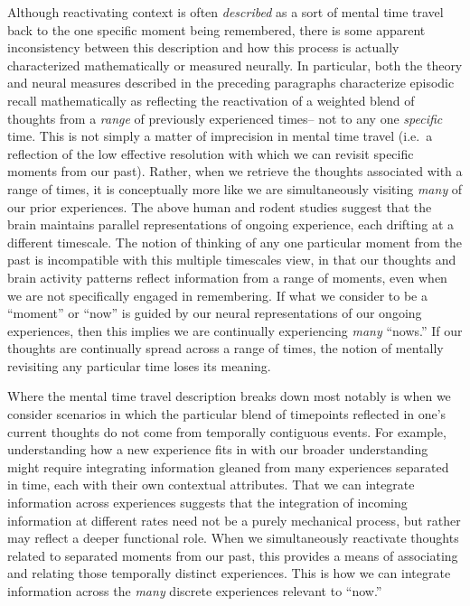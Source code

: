 \documentclass{article}
\begin{document}
Although reactivating context is often \textit{described} as a sort of mental time travel back to the one specific moment being remembered, there is some apparent inconsistency between this description and how this process is actually characterized mathematically or measured neurally.  In particular, both the theory and neural measures described in the preceding paragraphs characterize episodic recall mathematically as reflecting the reactivation of a weighted blend of thoughts from a \textit{range} of previously experienced times-- not to any one \textit{specific} time.  This is not simply a matter of imprecision in mental time travel (i.e.\ a reflection of the low effective resolution with which we can revisit specific moments from our past).  Rather, when we retrieve the thoughts associated with a range of times, it is conceptually more like we are simultaneously visiting \textit{many} of our prior experiences. The above human and rodent studies suggest that the brain maintains parallel representations of ongoing experience, each drifting at a different timescale.  The notion of thinking of any one particular moment from the past is incompatible with this multiple timescales view, in that our thoughts and brain activity patterns reflect information from a range of moments, even when we are not specifically engaged in remembering.  If what we consider to be a ``moment'' or ``now'' is guided by our neural representations of our ongoing experiences, then this implies we are continually experiencing \textit{many} ``nows.''  If our thoughts are continually spread across a range of times, the notion of mentally revisiting any particular time loses its meaning.

Where the mental time travel description breaks down most notably is when we consider scenarios in which the particular blend of timepoints reflected in one's current thoughts do not come from temporally contiguous events.  For example, understanding how a new experience fits in with our broader understanding might require integrating information gleaned from many experiences separated in time, each with their own contextual attributes.  That we can integrate information across experiences suggests that the integration of incoming information at different rates need not be a purely mechanical process, but rather may reflect a deeper functional role.  When we simultaneously reactivate thoughts related to separated moments from our past, this provides a means of associating and relating those temporally distinct experiences.  This is how we can integrate information across the \textit{many} discrete experiences relevant to ``now.''
\end{document}
